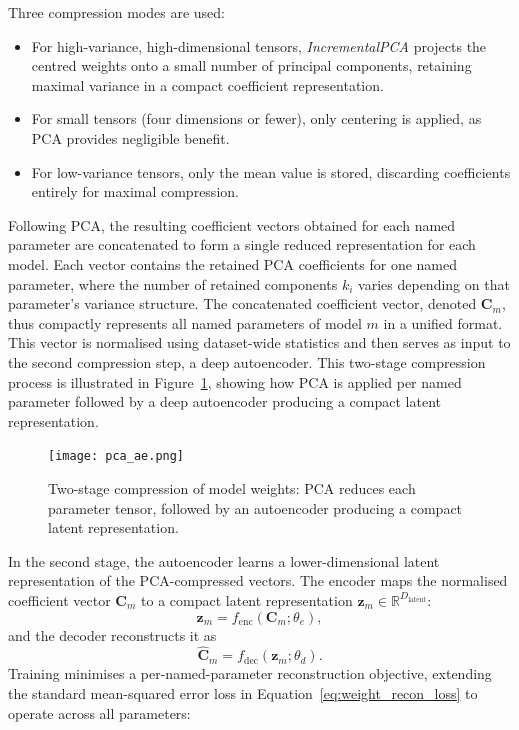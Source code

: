 Three compression modes are used:
\begin{itemize}
    \item For high-variance, high-dimensional tensors, \textit{IncrementalPCA} projects the centred weights onto a small number of principal components, retaining maximal variance in a compact coefficient representation.
    \item For small tensors (four dimensions or fewer), only centering is applied, as PCA provides negligible benefit.
    \item For low-variance tensors, only the mean value is stored, discarding coefficients entirely for maximal compression.
\end{itemize}

Following PCA, the resulting coefficient vectors obtained for each named parameter are concatenated to form a single reduced representation for each model. Each vector contains the retained PCA coefficients for one named parameter, where the number of retained components \(k_i\) varies depending on that parameter's variance structure. The concatenated coefficient vector, denoted \(\mathbf{C}_m\), thus compactly represents all named parameters of model \(m\) in a unified format. This vector is normalised using dataset-wide statistics and then serves as input to the second compression step, a deep autoencoder. This two-stage compression process is illustrated in Figure~\ref{fig:pca_ae}, showing how PCA is applied per named parameter followed by a deep autoencoder producing a compact latent representation.


\begin{figure}[!t]
    \centering
    \texttt{[image: pca\_ae.png]}
    \caption{Two-stage compression of model weights: PCA reduces each parameter tensor, followed by an autoencoder producing a compact latent representation.}

    \label{fig:pca_ae}
\end{figure}


In the second stage, the autoencoder learns a lower-dimensional latent representation of the PCA-compressed vectors. The encoder maps the normalised coefficient vector $\mathbf{C}_m$ to a compact latent representation $\mathbf{z}_m \in \mathbb{R}^{D_{\text{latent}}}$:
\[
\mathbf{z}_m = f_{\text{enc}}(\mathbf{C}_m; \theta_e),
\]
and the decoder reconstructs it as
\[
\hat{\mathbf{C}}_m = f_{\text{dec}}(\mathbf{z}_m; \theta_d).
\]
Training minimises a per-named-parameter reconstruction objective, extending the standard mean-squared error loss in Equation~\ref{eq:weight_recon_loss} to operate across all parameters:

